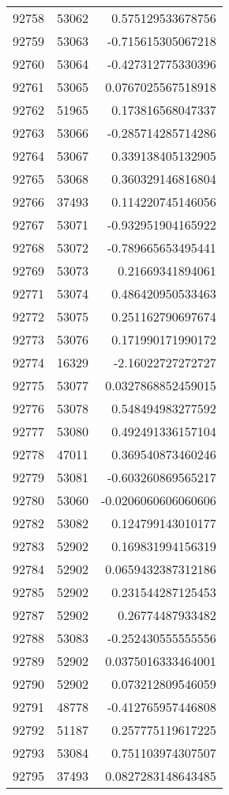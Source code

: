\begin{tabular}{r | r | r}
92758 & 53062 & 0.575129533678756 \\
92759 & 53063 & -0.715615305067218 \\
92760 & 53064 & -0.427312775330396 \\
92761 & 53065 & 0.0767025567518918 \\
92762 & 51965 & 0.173816568047337 \\
92763 & 53066 & -0.285714285714286 \\
92764 & 53067 & 0.339138405132905 \\
92765 & 53068 & 0.360329146816804 \\
92766 & 37493 & 0.114220745146056 \\
92767 & 53071 & -0.932951904165922 \\
92768 & 53072 & -0.789665653495441 \\
92769 & 53073 & 0.21669341894061 \\
92771 & 53074 & 0.486420950533463 \\
92772 & 53075 & 0.251162790697674 \\
92773 & 53076 & 0.171990171990172 \\
92774 & 16329 & -2.16022727272727 \\
92775 & 53077 & 0.0327868852459015 \\
92776 & 53078 & 0.548494983277592 \\
92777 & 53080 & 0.492491336157104 \\
92778 & 47011 & 0.369540873460246 \\
92779 & 53081 & -0.603260869565217 \\
92780 & 53060 & -0.0206060606060606 \\
92782 & 53082 & 0.124799143010177 \\
92783 & 52902 & 0.169831994156319 \\
92784 & 52902 & 0.0659432387312186 \\
92785 & 52902 & 0.231544287125453 \\
92787 & 52902 & 0.26774487933482 \\
92788 & 53083 & -0.252430555555556 \\
92789 & 52902 & 0.0375016333464001 \\
92790 & 52902 & 0.073212809546059 \\
92791 & 48778 & -0.412765957446808 \\
92792 & 51187 & 0.257775119617225 \\
92793 & 53084 & 0.751103974307507 \\
92795 & 37493 & 0.0827283148643485 \\

\end{tabular}
